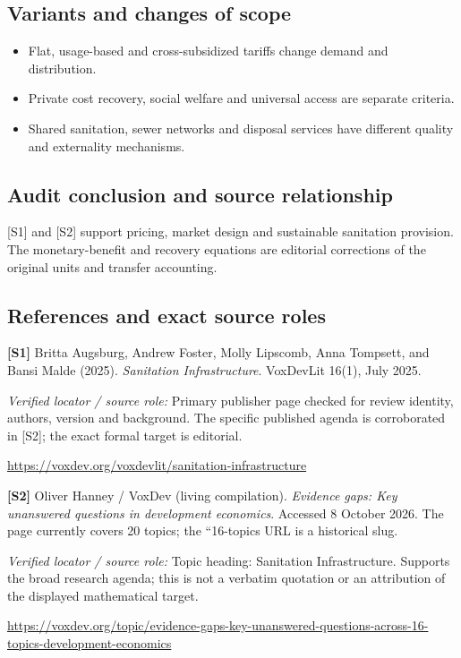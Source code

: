 \documentclass[11pt,a4paper]{article}
\begin{document}
\subsection*{Variants and changes of scope}

\begin{itemize}
\item Flat, usage-based and cross-subsidized tariffs change demand and distribution.
\item Private cost recovery, social welfare and universal access are separate criteria.
\item Shared sanitation, sewer networks and disposal services have different quality and externality mechanisms.
\end{itemize}

\subsection*{Audit conclusion and source relationship}

[S1] and [S2] support pricing, market design and sustainable sanitation provision. The monetary-benefit and recovery equations are editorial corrections of the original units and transfer accounting.

\subsection*{References and exact source roles}

{\footnotesize\raggedright
\par\noindent\textbf{[S1]} Britta Augsburg, Andrew Foster, Molly Lipscomb, Anna Tompsett, and Bansi Malde (2025). \emph{Sanitation Infrastructure}. VoxDevLit 16(1), July 2025.\par \textit{Verified locator / source role:} Primary publisher page checked for review identity, authors, version and background. The specific published agenda is corroborated in [S2]; the exact formal target is editorial.\par \url{https://voxdev.org/voxdevlit/sanitation-infrastructure}\par\smallskip
\par\noindent\textbf{[S2]} Oliver Hanney / VoxDev (living compilation). \emph{Evidence gaps: Key unanswered questions in development economics}. Accessed 8 October 2026. The page currently covers 20 topics; the ``16-topics URL is a historical slug.\par \textit{Verified locator / source role:} Topic heading: Sanitation Infrastructure. Supports the broad research agenda; this is not a verbatim quotation or an attribution of the displayed mathematical target.\par \url{https://voxdev.org/topic/evidence-gaps-key-unanswered-questions-across-16-topics-development-economics}\par\smallskip
}
\end{document}
